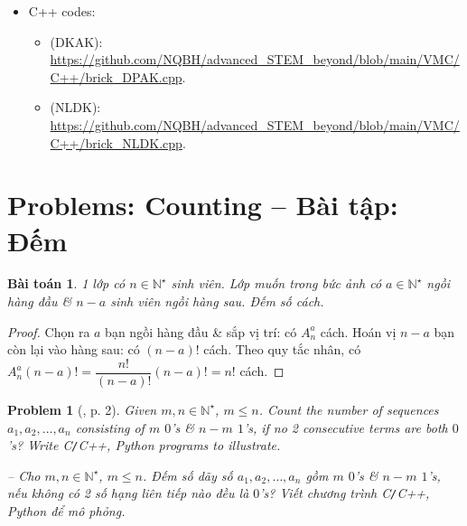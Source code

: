 \documentclass[oneside]{book}
\newtheorem{baitoan}{Bài toán}
\newtheorem{problem}{Problem}
\begin{document}
\begin{itemize}
	\item C++ codes:
	\begin{itemize}
		\item (DKAK): \url{https://github.com/NQBH/advanced_STEM_beyond/blob/main/VMC/C++/brick_DPAK.cpp}.
		\item (NLDK): \url{https://github.com/NQBH/advanced_STEM_beyond/blob/main/VMC/C++/brick_NLDK.cpp}.
	\end{itemize}
\end{itemize}


\section{Problems: Counting -- Bài tập: Đếm}

\begin{baitoan}
	1 lớp có $n\in\mathbb{N}^\star$ sinh viên. Lớp muốn trong bức ảnh có $a\in\mathbb{N}^\star$ ngồi hàng đầu \& $n - a$ sinh viên ngồi hàng sau. Đếm số cách.
\end{baitoan}

\begin{proof}
	Chọn ra $a$ bạn ngồi hàng đầu \& sắp vị trí: có $A_n^a$ cách. Hoán vị $n - a$ bạn còn lại vào hàng sau: có $(n - a)!$ cách. Theo quy tắc nhân, có $A_n^a(n - a)! = \dfrac{n!}{(n - a)!}(n - a)! = n!$ cách.
\end{proof}

\begin{problem}[\cite{Shahriari2022}, p. 2]
	Given $m,n\in\mathbb{N}^\star$, $m\le n$. Count the number of sequences $a_1,a_2,\ldots,a_n$ consisting of $m$ $0$'s \& $n - m$ $1$'s, if no 2 consecutive terms are both $0$'s? Write {\sf C{\tt/}C++, Python} programs to illustrate.
	
	-- Cho $m,n\in\mathbb{N}^\star$, $m\le n$. Đếm số dãy số $a_1,a_2,\ldots,a_n$ gồm $m$ $0$'s \& $n - m$ $1$'s, nếu không có 2 số hạng liên tiếp nào đều là $0$'s? Viết chương trình {\sf C{\tt/}C++, Python} để mô phỏng.
\end{problem}
\end{document}

